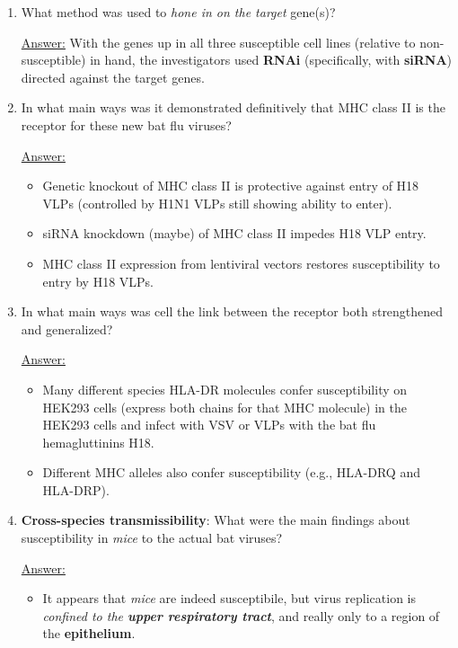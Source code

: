 \documentclass{article}
\newenvironment{QandA}{\begin{enumerate}[label=\bfseries Q\arabic*.]}
                       {\end{enumerate}}
\newenvironment{answered}{\par\normalfont\underline{Answer:}}{}
\begin{document}
\begin{QandA}
\begin{answered}
\begin{itemize}
    \end{itemize}
    \end{answered}
  \item{What method was used to \textit{hone in on the target} gene(s)?}
    \begin{answered}
    With the genes up in all three susceptible cell lines (relative to non-susceptible) in hand, the investigators used \textbf{RNAi} (specifically, with \textbf{siRNA}) directed against the target genes.
    \end{answered}
  \item{In what main ways was it demonstrated definitively that MHC class II is the receptor for these new bat flu viruses?}
    \begin{answered}
    \begin{itemize}
      \item{Genetic knockout of MHC class II is protective against entry of H18 VLPs (controlled by H1N1 VLPs still showing ability to enter).}
      \item{siRNA knockdown (maybe) of MHC class II impedes H18 VLP entry.}
      \item{MHC class II expression from lentiviral vectors restores susceptibility to entry by H18 VLPs.}
    \end{itemize}
    \end{answered}
  \item{In what main ways was cell the link between the receptor both strengthened and generalized?}
    \begin{answered}
    \begin{itemize}
      \item{Many different species HLA-DR molecules confer susceptibility on HEK293 cells (express both chains for that MHC molecule) in the HEK293 cells and infect with VSV or VLPs with the bat flu hemagluttinins H18.}
      \item{Different MHC alleles also confer susceptibility (e.g., HLA-DRQ and HLA-DRP).}
    \end{itemize}
    \end{answered}
  \item{\textbf{Cross-species transmissibility}: What were the main findings about susceptibility in \textit{mice} to the actual bat viruses?}
    \begin{answered}
    \begin{itemize}
      \item{It appears that \textit{mice} are indeed susceptibile, but virus replication is \textit{confined to the \textbf{upper respiratory tract}}, and really only to a region of the \textbf{epithelium}.}

\end{itemize}
\end{answered}
\end{QandA}
\end{document}
